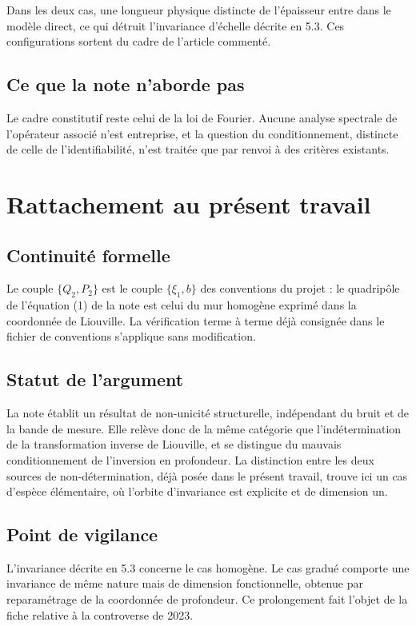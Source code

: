 \documentclass[11pt,a4paper]{article}
\begin{document}
Dans les deux cas, une longueur physique distincte de l'épaisseur entre dans le modèle direct, ce qui
détruit l'invariance d'échelle décrite en 5.3. Ces configurations sortent du cadre de l'article
commenté.

\subsection{Ce que la note n'aborde pas}

Le cadre constitutif reste celui de la loi de Fourier. Aucune analyse spectrale de l'opérateur associé
n'est entreprise, et la question du conditionnement, distincte de celle de l'identifiabilité, n'est
traitée que par renvoi à des critères existants.

\section{Rattachement au présent travail}

\subsection{Continuité formelle}

Le couple $\{Q_{2},P_{2}\}$ est le couple $\{\xi_{1},b\}$ des conventions du projet : le quadripôle de
l'équation (1) de la note est celui du mur homogène exprimé dans la coordonnée de Liouville. La
vérification terme à terme déjà consignée dans le fichier de conventions s'applique sans modification.

\subsection{Statut de l'argument}

La note établit un résultat de non-unicité structurelle, indépendant du bruit et de la bande de mesure.
Elle relève donc de la même catégorie que l'indétermination de la transformation inverse de Liouville,
et se distingue du mauvais conditionnement de l'inversion en profondeur. La distinction entre les deux
sources de non-détermination, déjà posée dans le présent travail, trouve ici un cas d'espèce
élémentaire, où l'orbite d'invariance est explicite et de dimension un.

\subsection{Point de vigilance}

L'invariance décrite en 5.3 concerne le cas homogène. Le cas gradué comporte une invariance de même
nature mais de dimension fonctionnelle, obtenue par reparamétrage de la coordonnée de profondeur. Ce
prolongement fait l'objet de la fiche relative à la controverse de 2023.
\end{document}
